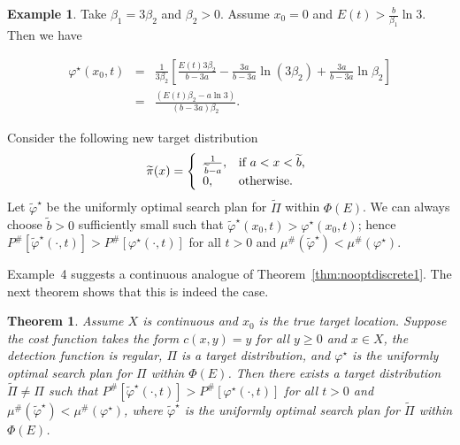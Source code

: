 \documentclass[12pt]{article}
\newtheorem{theorem}{Theorem}[section]
\theoremstyle{plain}
\theoremstyle{definition}
\newtheorem{example}{Example}%
\theoremstyle{remark}
\begin{document}
\begin{example}
Take $\beta_1=3\beta_2$ and $\beta_2>0$.  Assume $x_0=0$ and $E(t)>\frac{b}{\beta_1}\ln 3$. Then we have 

\begin{eqnarray*}
\varphi^\star(x_0, t) &=&    \frac{1}{3\beta_2} \left[\frac{E(t)3\beta_2}{b-3a}-\frac{3a}{b-3a}\ln (3\beta_2)+
		                          \frac{3a}{b-3a}\ln \beta_2
		                          \right]\\
		                          &=& \frac{(E(t)\beta_2-a\ln 3)}{(b-3a)\beta_2}.
\end{eqnarray*}

Consider the following new target distribution
\[
\widetilde{\pi}(x)=\left\{
		                           \begin{array}{ll}
		                         \frac{1}{\widetilde{b}-a},& \hbox{if $a<x<\widetilde{b}$,} \\
					0,  & \hbox{otherwise.} 
		                          \end{array}
		                         \right.
\]
Let $\widetilde{\varphi}^\star$ be the uniformly optimal search plan for $\widetilde{\Pi}$ within $\Phi(E)$.  We can always choose $\widetilde{b}>0$ sufficiently small such that $\widetilde{\varphi}^\star(x_0, t) >\varphi^\star(x_0, t)$; hence $P^{\#}[\widetilde{\varphi}^\star(\cdot, t)]>P^{\#}[\varphi^\star(\cdot, t)]$ for all $t>0$ and $\mu^{\#}(\widetilde{\varphi}^\star)<\mu^{\#}(\varphi^\star)$.
\end{example}

Example~4 suggests a continuous analogue of Theorem~\ref{thm:nooptdiscrete1}.  The next theorem shows that this is indeed the case.



\begin{theorem}
\label{thm:nooptcontinuous1}
Assume $X$ is continuous and $x_0$ is the true target location.  Suppose the cost function takes the form $c(x,y)=y$ for all $y\geq 0$ and $x \in X$,  the detection function is  regular,  $\Pi$ is a target distribution, and $\varphi^\star$ is the uniformly optimal search plan for $\Pi$ within $\Phi(E)$.  Then there exists a target distribution $\widetilde{\Pi}\neq \Pi$ such that $P^{\#}[\widetilde{\varphi}^\star(\cdot, t)]>P^{\#}[\varphi^\star(\cdot, t)]$ for all $t>0$ and $\mu^{\#}(\widetilde{\varphi}^\star)<\mu^{\#}(\varphi^\star)$, where $\widetilde{\varphi}^\star$ is the uniformly optimal search plan for $\widetilde{\Pi}$ within $\Phi(E)$.
\end{theorem}
\end{document}
